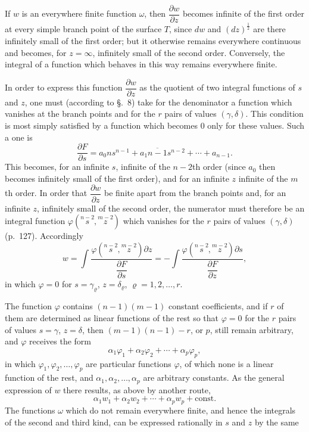 \documentclass{article}
\begin{document}
If $w$ is an everywhere finite function $\omega$, then $\dfrac{\partial w}{\partial z}$ becomes infinite of the first order at every simple branch point of the surface $T$, since $dw$ and $(dz)^{\frac{1}{2}}$ are there infinitely small of the first order; but it otherwise remains everywhere continuous and becomes, for $z = \infty$, infinitely small of the second order. Conversely, the integral of a function which behaves in this way remains everywhere finite.

In order to express this function $\dfrac{\partial w}{\partial z}$ as the quotient of two integral functions of $s$ and $z$, one must (according to §.~8) take for the denominator a function which vanishes at the branch points and for the $r$ pairs of values $(\gamma, \delta)$. This condition is most simply satisfied by a function which becomes 0 only for these values. Such a one is
\[ \frac{\partial F}{\partial s} = a_{0} n s^{n-1} + a_{1} \overline{n-1} s^{n-2} + \cdots + a_{n-1}. \]
This becomes, for an infinite $s$, infinite of the $n-2$th order (since $a_{0}$ then becomes infinitely small of the first order), and for an infinite $z$ infinite of the $m$th order. In order that $\dfrac{\partial w}{\partial z}$ be finite apart from the branch points and, for an infinite $z$, infinitely small of the second order, the numerator must therefore be an integral function $\varphi(\overset{n-2}{s}, \overset{m-2}{z})$ which vanishes for the $r$ pairs of values $(\gamma, \delta)$ (p.~127). Accordingly
\[ w = \int \frac{\varphi(\overset{n-2}{s}, \overset{m-2}{z}) \partial z}{\dfrac{\partial F}{\partial s}} = -\int \frac{\varphi(\overset{n-2}{s}, \overset{m-2}{z}) \partial s}{\dfrac{\partial F}{\partial z}}, \]
in which $\varphi = 0$ for $s = \gamma_{\varrho}$, $z = \delta_{\varrho}$, $\varrho = 1, 2, \ldots, r$.

The function $\varphi$ contains $(n-1)(m-1)$ constant coefficients, and if $r$ of them are determined as linear functions of the rest so that $\varphi = 0$ for the $r$ pairs of values $s = \gamma$, $z = \delta$, then $(m-1)(n-1)-r$, or $p$, still remain arbitrary, and $\varphi$ receives the form
\[ \alpha_{1}\varphi_{1} + \alpha_{2}\varphi_{2} + \cdots + \alpha_{p}\varphi_{p}, \]
in which $\varphi_{1}, \varphi_{2}, \ldots, \varphi_{p}$ are particular functions $\varphi$, of which none is a linear function of the rest, and $\alpha_{1}, \alpha_{2}, \ldots, \alpha_{p}$ are arbitrary constants. As the general expression of $w$ there results, as above by another route,
\[ \alpha_{1} w_{1} + \alpha_{2} w_{2} + \cdots + \alpha_{p} w_{p} + \text{const.} \]
The functions $\omega$ which do not remain everywhere finite, and hence the integrals of the second and third kind, can be expressed rationally in $s$ and $z$ by the same
\end{document}
